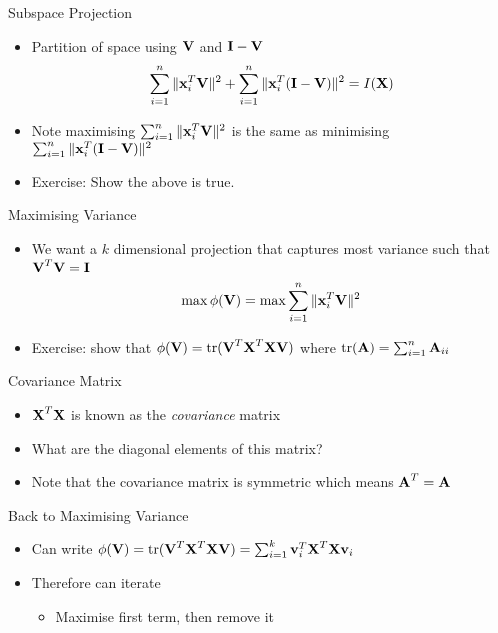 \documentclass{beamer}
\begin{document}
\begin{frame}{Subspace Projection}
\begin{itemize} 
 \item Partition of space using $\textbf{V}$ and $\textbf{I} - \textbf{V}$
 \begin{displaymath}
  \sum_{i=1}^n \|\textbf{x}_{i}^T\textbf{V} \|^2 + \sum_{i=1}^n \|\textbf{x}_{i}^T(\textbf{I} - \textbf{V})\|^2 = I(\textbf{X})
 \end{displaymath}
\item Note maximising $\sum_{i=1}^n \|\textbf{x}_{i}^T\textbf{V} \|^2 $ is the same as minimising $\sum_{i=1}^n \|\textbf{x}_{i}^T(\textbf{I} - \textbf{V})\|^2$
\item Exercise: Show the above is true.  
\end{itemize}
\end{frame}

\begin{frame}{Maximising Variance}
\begin{itemize}
 \item We want a $k$ dimensional projection that captures most variance such that $\textbf{V}^T\textbf{V} = \textbf{I}$
 \begin{displaymath}
  \max \phi(\textbf{V}) = \max \sum_{i=1}^n \|\textbf{x}_{i}^T\textbf{V} \|^2
 \end{displaymath}
\item Exercise: show that $\phi(\textbf{V}) = \mbox{tr}(\textbf{V}^T\textbf{X}^T\textbf{X}\textbf{V})$ where $\mbox{tr}(\textbf{A}) = \sum_{i=1}^n \textbf{A}_{ii}$
\end{itemize}
\end{frame}

\begin{frame}{Covariance Matrix}
\begin{itemize} 
 \item $\textbf{X}^T\textbf{X}$ is known as the \emph{covariance} matrix 
 \item What are the diagonal elements of this matrix? 
 \item Note that the covariance matrix is symmetric which means $\textbf{A}^T = \textbf{A}$
\end{itemize}
\end{frame}

\begin{frame}{Back to Maximising Variance} 
\begin{itemize} 
 \item Can write $\phi(\textbf{V}) = \mbox{tr}(\textbf{V}^T\textbf{X}^T\textbf{X}\textbf{V}) = \sum_{i=1}^k \textbf{v}_i^T\textbf{X}^T\textbf{X}\textbf{v}_i$
 \item Therefore can iterate
 \begin{itemize}
 \item Maximise first term, then remove it 
 \end{itemize}
\end{itemize}
 
\end{frame}
\end{document}
